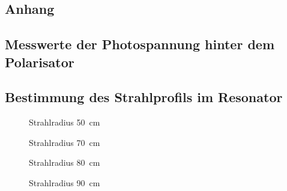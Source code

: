 \documentclass[11pt, a4paper]{article}
\numberwithin{equation}{section}
\begin{document}
\begin{appendix}
\section{Anhang}
\subsection{Messwerte der Photospannung hinter dem Polarisator}
\begin{table}[h]
	\centering
	
	\caption{Messwerte der Spannung an der Photodiode in Abhängigkeit des Winkels am Linearpolarisator}
	\label{tab:malus}
\end{table}

\clearpage
\subsection{Bestimmung des Strahlprofils im Resonator}
\label{app:strahlprofil}
\FloatBarrier
\begin{table}[t]
	\centering
	
	\caption{Messdaten \SI{50}{\centi\metre}}
	\label{tab:strahlradius_50}
\end{table}
\begin{figure}[b]
	\centering
	
	\caption{Strahlradius \SI{50}{\centi\metre}}
	\label{fig:strahlradius_50}
\end{figure}
\FloatBarrier
\begin{table}[t]
	\centering
	
	\caption{Messdaten \SI{70}{\centi\metre}}
	\label{tab:strahlradius_70}
\end{table}
\begin{figure}[b]
	\centering
	
	\caption{Strahlradius \SI{70}{\centi\metre}}
	\label{fig:strahlradius_70}
\end{figure}
\FloatBarrier
\begin{table}[t]
	\centering
	
	\caption{Messdaten \SI{80}{\centi\metre}}
	\label{tab:strahlradius_80}
\end{table}
\begin{figure}[b]
	\centering
	
	\caption{Strahlradius \SI{80}{\centi\metre}}
	\label{fig:strahlradius_80}
\end{figure}
\FloatBarrier
\begin{table}[t]
	\centering
	
	\caption{Messdaten \SI{90}{\centi\metre}}
	\label{tab:strahlradius_90}
\end{table}
\begin{figure}[b]
	\centering
	
	\caption{Strahlradius \SI{90}{\centi\metre}}
	\label{fig:strahlradius_90}
\end{figure}
\FloatBarrier


\end{appendix}
\end{document}
